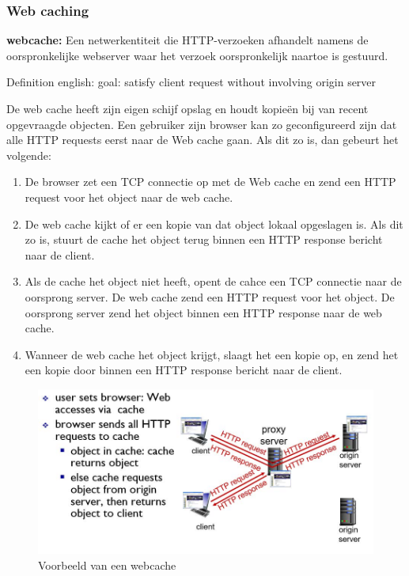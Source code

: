 \subsubsection{Web caching}

\noindent \textbf{\gls{webcache}:} Een netwerkentiteit die HTTP-verzoeken afhandelt namens de oorspronkelijke webserver waar het verzoek oorspronkelijk naartoe is gestuurd.

\noindent Definition english: goal: satisfy client request without involving origin server

\noindent De web cache heeft zijn eigen schijf opslag en houdt kopieën bij van recent opgevraagde objecten. Een gebruiker zijn browser kan zo geconfigureerd zijn dat alle HTTP requests eerst naar de Web cache gaan. Als dit zo is, dan gebeurt het volgende:
\begin{enumerate}
    \item De browser zet een TCP connectie op met de Web cache en zend een HTTP request voor het object naar de web cache.
\item De web cache kijkt of er een kopie van dat object lokaal opgeslagen is. Als dit zo is, stuurt de cache het object terug binnen een HTTP response bericht naar de client.
\item Als de cache het object niet heeft, opent de cahce een TCP connectie naar de oorsprong server. De web cache zend een HTTP request voor het object. De oorsprong server zend het object binnen een HTTP response naar de web cache.
\item Wanneer de web cache het object krijgt, slaagt het een kopie op, en zend het een kopie door binnen een HTTP response bericht naar de client.
\end{enumerate}

\begin{figure}[h]
\centering
\includegraphics[width=4.5in]{./img/imghfdst2/webcache.jpg}
\caption{Voorbeeld van een webcache }
\label{fig:webcache}
\end{figure}

